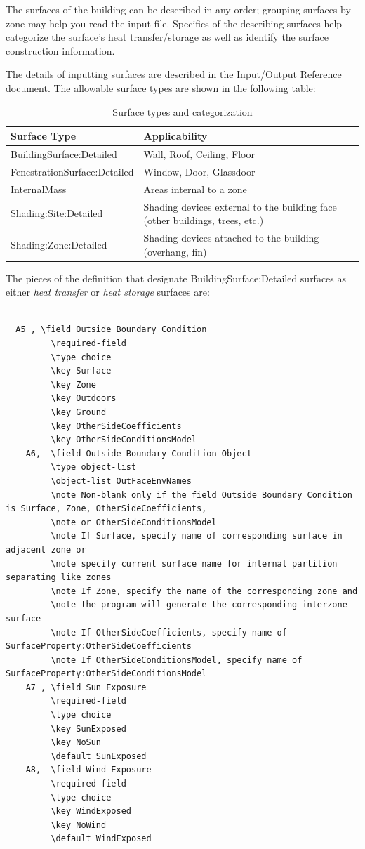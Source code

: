 The surfaces of the building can be described in any order; grouping surfaces by zone may help you read the input file. Specifics of the describing surfaces help categorize the surface's heat transfer/storage as well as identify the surface construction information.

The details of inputting surfaces are described in the Input/Output Reference document. The allowable surface types are shown in the following table:

\begin{longtable}[c]{p{1.61in}p{4.38in}}
\caption{Surface types and categorization \protect \label{table:surface-types-and-categorization}}\\
\toprule 
Surface Type & Applicability \tabularnewline \midrule
\endhead
BuildingSurface:Detailed & Wall, Roof, Ceiling, Floor \tabularnewline
FenestrationSurface:Detailed & Window, Door, Glassdoor \tabularnewline
InternalMass & Areas internal to a zone \tabularnewline
Shading:Site:Detailed & Shading devices external to the building face (other buildings, trees, etc.) \tabularnewline
Shading:Zone:Detailed & Shading devices attached to the building (overhang, fin) \tabularnewline
\bottomrule
\end{longtable}

The pieces of the definition that designate BuildingSurface:Detailed surfaces as either \emph{heat transfer} or \emph{heat storage} surfaces are:

\begin{lstlisting}

  A5 , \field Outside Boundary Condition
         \required-field
         \type choice
         \key Surface
         \key Zone
         \key Outdoors
         \key Ground
         \key OtherSideCoefficients
         \key OtherSideConditionsModel
    A6,  \field Outside Boundary Condition Object
         \type object-list
         \object-list OutFaceEnvNames
         \note Non-blank only if the field Outside Boundary Condition is Surface, Zone, OtherSideCoefficients,
         \note or OtherSideConditionsModel
         \note If Surface, specify name of corresponding surface in adjacent zone or
         \note specify current surface name for internal partition separating like zones
         \note If Zone, specify the name of the corresponding zone and
         \note the program will generate the corresponding interzone surface
         \note If OtherSideCoefficients, specify name of SurfaceProperty:OtherSideCoefficients
         \note If OtherSideConditionsModel, specify name of SurfaceProperty:OtherSideConditionsModel
    A7 , \field Sun Exposure
         \required-field
         \type choice
         \key SunExposed
         \key NoSun
         \default SunExposed
    A8,  \field Wind Exposure
         \required-field
         \type choice
         \key WindExposed
         \key NoWind
         \default WindExposed
\end{lstlisting}

